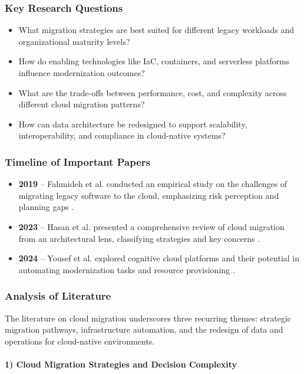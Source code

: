 \documentclass[12pt]{article}
\begin{document}
\subsubsection{Key Research Questions}

\begin{itemize}
    \item What migration strategies are best suited for different legacy workloads and organizational maturity levels?
    \item How do enabling technologies like IaC, containers, and serverless platforms influence modernization outcomes?
    \item What are the trade-offs between performance, cost, and complexity across different cloud migration patterns?
    \item How can data architecture be redesigned to support scalability, interoperability, and compliance in cloud-native systems?
\end{itemize}

\subsubsection{Timeline of Important Papers}

\begin{itemize}
    \item \textbf{2019} – Fahmideh et al. conducted an empirical study on the challenges of migrating legacy software to the cloud, emphasizing risk perception and planning gaps \cite{fahmideh2019}.
    \item \textbf{2023} – Hasan et al. presented a comprehensive review of cloud migration from an architectural lens, classifying strategies and key concerns \cite{hasan2023}.
    \item \textbf{2024} – Yousef et al. explored cognitive cloud platforms and their potential in automating modernization tasks and resource provisioning \cite{yousef2024}.
\end{itemize}

\subsubsection{Analysis of Literature}

The literature on cloud migration underscores three recurring themes: strategic migration pathways, infrastructure automation, and the redesign of data and operations for cloud-native environments.

\paragraph{1) Cloud Migration Strategies and Decision Complexity}
\end{document}
